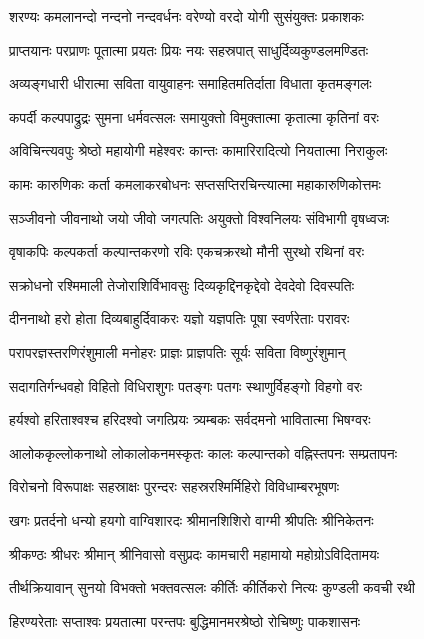 \twolineshloka
{शरण्यः कमलानन्दो नन्दनो नन्दवर्धनः}
{वरेण्यो वरदो योगी सुसंयुक्तः प्रकाशकः} %

\twolineshloka
{प्राप्तयानः परप्राणः पूतात्मा प्रयतः प्रियः}
{नयः सहस्रपात् साधुर्दिव्यकुण्डलमण्डितः}%

\twolineshloka
{अव्यङ्गधारी धीरात्मा सविता वायुवाहनः}
{समाहितमतिर्दाता विधाता कृतमङ्गलः}%

\twolineshloka
{कपर्दी कल्पपाद्रुद्रः सुमना धर्मवत्सलः}
{समायुक्तो विमुक्तात्मा कृतात्मा कृतिनां वरः}%

\twolineshloka
{अविचिन्त्यवपुः श्रेष्ठो महायोगी महेश्वरः}
{कान्तः कामारिरादित्यो नियतात्मा निराकुलः}%

\twolineshloka
{कामः कारुणिकः कर्ता कमलाकरबोधनः}
{सप्तसप्तिरचिन्त्यात्मा महाकारुणिकोत्तमः}%

\twolineshloka
{सञ्जीवनो जीवनाथो जयो जीवो जगत्पतिः}
{अयुक्तो विश्वनिलयः संविभागी वृषध्वजः}%

\twolineshloka
{वृषाकपिः कल्पकर्ता कल्पान्तकरणो रविः}
{एकचक्ररथो मौनी सुरथो रथिनां वरः}%

\twolineshloka
{सक्रोधनो रश्मिमाली तेजोराशिर्विभावसुः}
{दिव्यकृद्दिनकृद्देवो देवदेवो दिवस्पतिः}%

\twolineshloka
{दीननाथो हरो  होता दिव्यबाहुर्दिवाकरः}
{यज्ञो यज्ञपतिः पूषा स्वर्णरेताः परावरः}%

\twolineshloka
{परापरज्ञस्तरणिरंशुमाली मनोहरः}
{प्राज्ञः प्राज्ञपतिः सूर्यः सविता विष्णुरंशुमान्}%

\twolineshloka
{सदागतिर्गन्धवहो विहितो विधिराशुगः}
{पतङ्गः पतगः स्थाणुर्विहङ्गो विहगो वरः}%

\twolineshloka
{हर्यश्वो हरिताश्वश्च हरिदश्वो जगत्प्रियः}
{त्र्यम्बकः सर्वदमनो भावितात्मा भिषग्वरः}%

\twolineshloka
{आलोककृल्लोकनाथो लोकालोकनमस्कृतः}
{कालः कल्पान्तको वह्निस्तपनः सम्प्रतापनः}%

\twolineshloka
{विरोचनो विरूपाक्षः सहस्राक्षः पुरन्दरः}
{सहस्ररश्मिर्मिहिरो विविधाम्बरभूषणः}%

\twolineshloka
{खगः प्रतर्दनो धन्यो हयगो वाग्विशारदः}
{श्रीमानशिशिरो वाग्मी श्रीपतिः श्रीनिकेतनः}%

\twolineshloka
{श्रीकण्ठः श्रीधरः श्रीमान्  श्रीनिवासो वसुप्रदः}
{कामचारी महामायो महोग्रोऽविदितामयः}%

\twolineshloka
{तीर्थक्रियावान् सुनयो विभक्तो भक्तवत्सलः}
{कीर्तिः कीर्तिकरो नित्यः कुण्डली कवची रथी}%

\twolineshloka
{हिरण्यरेताः सप्ताश्वः प्रयतात्मा परन्तपः}
{बुद्धिमानमरश्रेष्ठो रोचिष्णुः पाकशासनः}%

